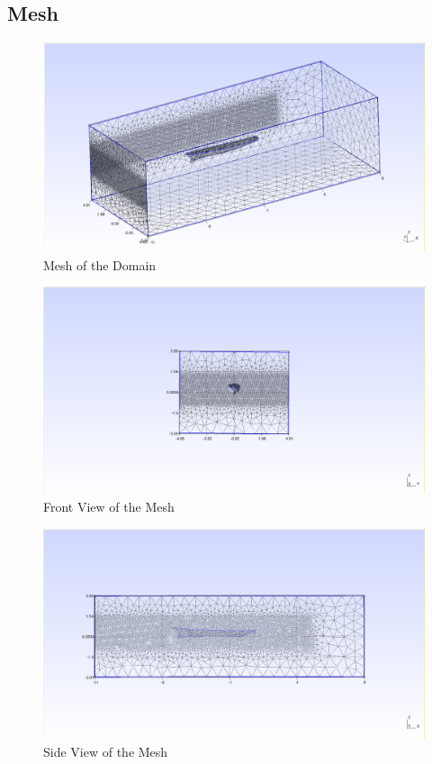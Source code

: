 \documentclass[12pt]{article} %
\begin{document}
\subsection{Mesh}
\begin{figure}[h]
    \centering
    \includegraphics[width=1\textwidth]{Mesh_1.png}
    \caption{Mesh of the Domain}
    
\end{figure}
\begin{figure}[h]
    \centering
    \includegraphics[width=1\textwidth]{Mesh_2.png}
    \caption{Front View of the Mesh}
\end{figure}

\begin{figure}[h]
    \centering
    \includegraphics[width=1\textwidth]{Mesh_3.png}
    \caption{Side View of the Mesh}
\end{figure}
\end{document}

